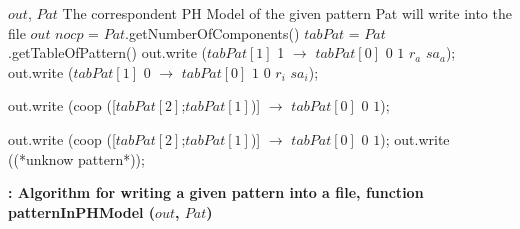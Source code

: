 
\begin{algorithm}
\begin{algorithmic}[H]
\REQUIRE $out$, $Pat$ 
\ENSURE The correspondent PH Model of the given pattern Pat will write into the file $out$
\STATE $nocp$ = $Pat$.getNumberOfComponents() 
\STATE $tabPat$ = $Pat$.getTableOfPattern() 
  \STATE out.write ($tabPat[1]$ 1 $\rightarrow$ $tabPat[0]$ $0$ $1$ $r_{a}$ $sa_{a}$);       
\ENDCASE
{}
  \STATE out.write ($tabPat[1]$ 0 $\rightarrow$ $tabPat[0]$ $1$ $0$ $r_{i}$ $sa_{i}$);    
\ENDSWITCH
   
   
\ENDCASE

   \STATE out.write (coop ([$tabPat[2]$;$tabPat[1]$)] $\rightarrow$ $tabPat[0]$ $0$ $1$); 
        
\ENDCASE
{}
  \STATE out.write (coop ([$tabPat[2]$;$tabPat[1]$)] $\rightarrow$ $tabPat[0]$ $0$ $1$); 
\DEFAULT
 \STATE out.write ((*unknow pattern*));
 \ENDDEFAULT
\ENDSWITCH
   
   
\ENDCASE
\ENDSWITCH
\end{algorithmic}
\caption{\bf: Algorithm for writing a given pattern into a file, function patternInPHModel ($out$, $Pat$)} \label{PHModelGeneration}
\end{algorithm}

